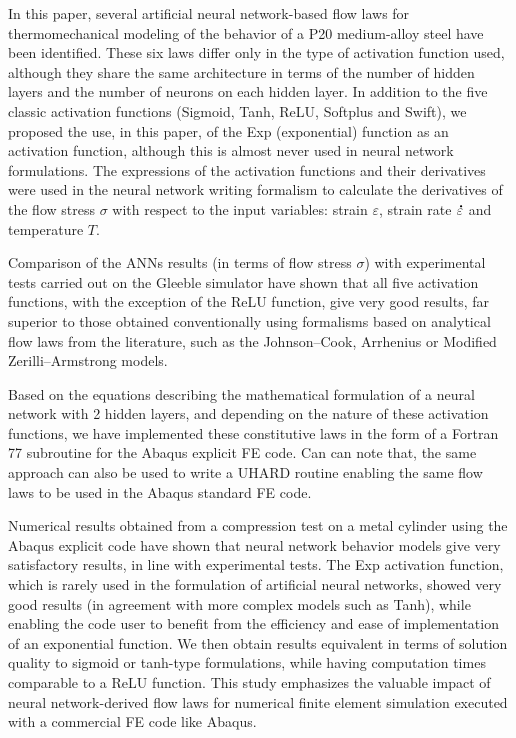 \documentclass[algorithms,article,submit,pdftex,oneauthors]{Definitions/mdpi}
\DeclareRobustCommand{\mdot}[1]{\accentset{\mbox{\bfseries .}}{#1}}
\begin{document}
In this paper, several artificial neural network-based flow laws for thermomechanical modeling of the behavior of a P20 medium-alloy steel have been identified.
These six laws differ only in the type of activation function used, although they share the same architecture in terms of the number of hidden layers and the number of neurons on each hidden layer.
In addition to the five classic activation functions (Sigmoid, Tanh, ReLU, Softplus and Swift), we proposed the use, in this paper, of the Exp (exponential) function as an activation function, although this is almost never used in neural network formulations.
The expressions of the activation functions and their derivatives were used in the neural network writing formalism to calculate the derivatives of the flow stress $\sigma$ with respect to the input variables: strain $\varepsilon$, strain rate $\mdot{\varepsilon}$ and temperature $T$.

Comparison of the ANNs results (in terms of flow stress $\sigma$) with experimental tests carried out on the Gleeble simulator have shown that all five activation functions, with the exception of the ReLU function, give very good results, far superior to those obtained conventionally using formalisms based on analytical flow laws from the literature, such as the Johnson--Cook, Arrhenius or Modified Zerilli--Armstrong models.

Based on the equations describing the mathematical formulation of a neural network with 2 hidden layers, and depending on the nature of these activation functions, we have implemented these constitutive laws in the form of a Fortran 77 subroutine for the Abaqus explicit FE code.
Can can note that, the same approach can also be used to write a UHARD routine enabling the same flow laws to be used in the Abaqus standard FE code.

Numerical results obtained from a compression test on a metal cylinder using the Abaqus explicit code have shown that neural network behavior models give very satisfactory results, in line with experimental tests.
The Exp activation function, which is rarely used in the formulation of artificial neural networks, showed very good results (in agreement with more complex models such as Tanh), while enabling the code user to benefit from the efficiency and ease of implementation of an exponential function.
We then obtain results equivalent in terms of solution quality to sigmoid or tanh-type formulations, while having computation times comparable to a ReLU function.
This study emphasizes the valuable impact of neural network-derived flow laws for numerical finite element simulation executed with a commercial FE code like Abaqus.
\end{document}
